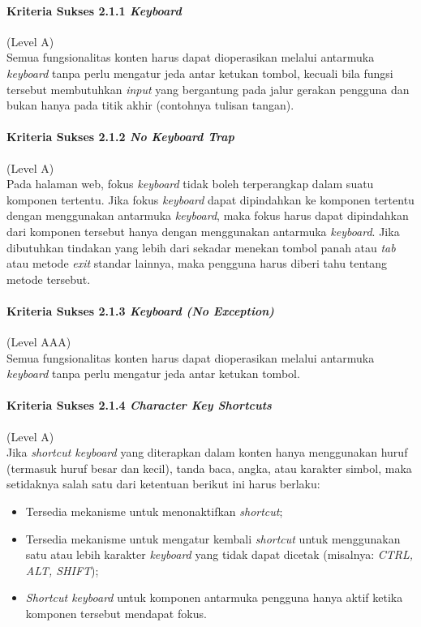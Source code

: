 \paragraph{Kriteria Sukses 2.1.1 \textit{Keyboard}}
\label{sec:kriteria_sukses_2.1.1}
(Level A)\\

Semua fungsionalitas konten harus dapat dioperasikan melalui antarmuka \textit{keyboard} tanpa perlu mengatur jeda antar ketukan tombol, kecuali bila fungsi tersebut membutuhkan \textit{input} yang bergantung pada jalur gerakan pengguna dan bukan hanya pada titik akhir (contohnya tulisan tangan).

\paragraph{Kriteria Sukses 2.1.2 \textit{No Keyboard Trap}}
\label{sec:kriteria_sukses_2.1.2}
(Level A)\\

Pada halaman web, fokus \textit{keyboard} tidak boleh terperangkap dalam suatu komponen tertentu. Jika fokus \textit{keyboard} dapat dipindahkan ke komponen tertentu dengan menggunakan antarmuka \textit{keyboard}, maka fokus harus dapat dipindahkan dari komponen tersebut hanya dengan menggunakan antarmuka \textit{keyboard}. Jika dibutuhkan tindakan yang lebih dari sekadar menekan tombol panah atau \textit{tab} atau metode \textit{exit} standar lainnya, maka pengguna harus diberi tahu tentang metode tersebut.

\paragraph{Kriteria Sukses 2.1.3 \textit{Keyboard (No Exception)}}
\label{sec:kriteria_sukses_2.1.3}
(Level AAA)\\

Semua fungsionalitas konten harus dapat dioperasikan melalui antarmuka \textit{keyboard} tanpa perlu mengatur jeda antar ketukan tombol.

\paragraph{Kriteria Sukses 2.1.4 \textit{Character Key Shortcuts}}
\label{sec:kriteria_sukses_2.1.4}
(Level A)\\

Jika \textit{shortcut keyboard} yang diterapkan dalam konten hanya menggunakan huruf (termasuk huruf besar dan kecil), tanda baca, angka, atau karakter simbol, maka setidaknya salah satu dari ketentuan berikut ini harus berlaku:
\begin{itemize}
	\item Tersedia mekanisme untuk menonaktifkan \textit{shortcut};
	\item Tersedia mekanisme untuk mengatur kembali \textit{shortcut} untuk menggunakan satu atau lebih karakter \textit{keyboard} yang tidak dapat dicetak (misalnya: \textit{CTRL, ALT, SHIFT});
	\item \textit{Shortcut keyboard} untuk komponen antarmuka pengguna hanya aktif ketika komponen tersebut mendapat fokus.
\end{itemize}

